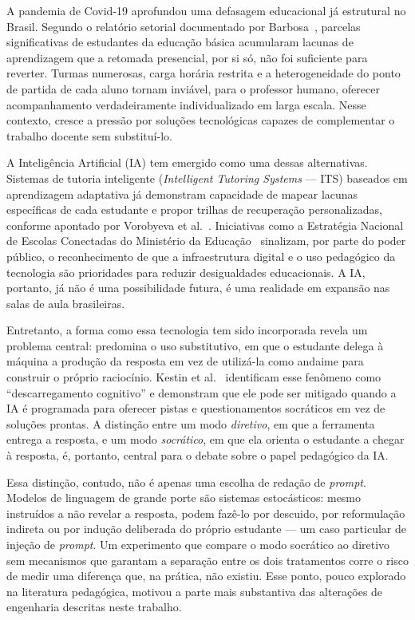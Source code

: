\documentclass[10pt, a4paper, twocolumn]{article}
\begin{document}
A pandemia de Covid-19 aprofundou uma defasagem educacional já estrutural no
Brasil. Segundo o relatório setorial documentado por Barbosa~\cite{cetic2025},
parcelas significativas de estudantes da educação básica acumularam lacunas de
aprendizagem que a retomada presencial, por si só, não foi suficiente para
reverter. Turmas numerosas, carga horária restrita e a heterogeneidade do ponto
de partida de cada aluno tornam inviável, para o professor humano, oferecer
acompanhamento verdadeiramente individualizado em larga escala. Nesse contexto,
cresce a pressão por soluções tecnológicas capazes de complementar o trabalho
docente sem substituí-lo.

A Inteligência Artificial (IA) tem emergido como uma dessas alternativas.
Sistemas de tutoria inteligente (\textit{Intelligent Tutoring Systems} --- ITS)
baseados em aprendizagem adaptativa já demonstram capacidade de mapear lacunas
específicas de cada estudante e propor trilhas de recuperação personalizadas,
conforme apontado por Vorobyeva et al.~\cite{roe2025}. Iniciativas como a
Estratégia Nacional de Escolas Conectadas do Ministério da
Educação~\cite{mec2023} sinalizam, por parte do poder público, o reconhecimento
de que a infraestrutura digital e o uso pedagógico da tecnologia são prioridades
para reduzir desigualdades educacionais. A IA, portanto, já não é uma
possibilidade futura, é uma realidade em expansão nas salas de aula brasileiras.

Entretanto, a forma como essa tecnologia tem sido incorporada revela um problema
central: predomina o uso substitutivo, em que o estudante delega à máquina a
produção da resposta em vez de utilizá-la como andaime para construir o próprio
raciocínio. Kestin et al.~\cite{kestin2025} identificam esse fenômeno como
``descarregamento cognitivo'' e demonstram que ele pode ser mitigado quando a IA
é programada para oferecer pistas e questionamentos socráticos em vez de
soluções prontas. A distinção entre um modo \textit{diretivo}, em que a
ferramenta entrega a resposta, e um modo \textit{socrático}, em que ela orienta o
estudante a chegar à resposta, é, portanto, central para o debate sobre o papel
pedagógico da IA.

Essa distinção, contudo, não é apenas uma escolha de redação de \textit{prompt}.
Modelos de linguagem de grande porte são sistemas estocásticos: mesmo instruídos
a não revelar a resposta, podem fazê-lo por descuido, por reformulação indireta
ou por indução deliberada do próprio estudante --- um caso particular de injeção
de \textit{prompt}. Um experimento que compare o modo socrático ao diretivo sem
mecanismos que garantam a separação entre os dois tratamentos corre o risco de
medir uma diferença que, na prática, não existiu. Esse ponto, pouco explorado na
literatura pedagógica, motivou a parte mais substantiva das alterações de
engenharia descritas neste trabalho.
\end{document}
